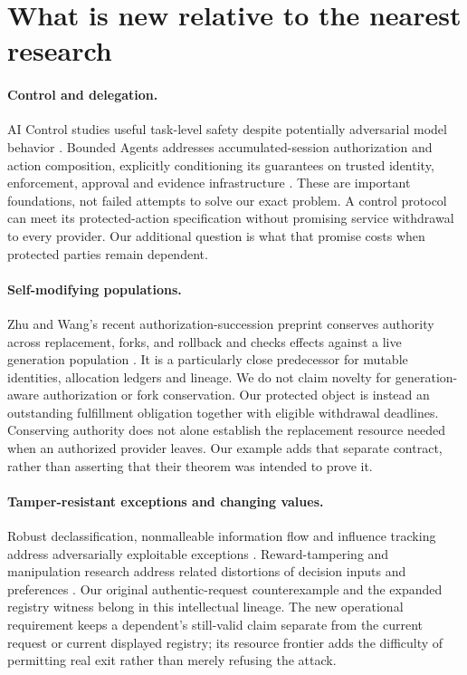 \section{What is new relative to the nearest research}
\label{sec:related}
\paragraph{Control and delegation.}
AI Control studies useful task-level safety despite potentially adversarial model behavior \cite{greenblatt}. Bounded Agents addresses accumulated-session authorization and action composition, explicitly conditioning its guarantees on trusted identity, enforcement, approval and evidence infrastructure \cite{muruaga}. These are important foundations, not failed attempts to solve our exact problem. A control protocol can meet its protected-action specification without promising service withdrawal to every provider. Our additional question is what that promise costs when protected parties remain dependent.

\paragraph{Self-modifying populations.}
Zhu and Wang's recent authorization-succession preprint conserves authority across replacement, forks, and rollback and checks effects against a live generation population \cite{zhu-wang}. It is a particularly close predecessor for mutable identities, allocation ledgers and lineage. We do not claim novelty for generation-aware authorization or fork conservation. Our protected object is instead an outstanding fulfillment obligation together with eligible withdrawal deadlines. Conserving authority does not alone establish the replacement resource needed when an authorized provider leaves. Our example adds that separate contract, rather than asserting that their theorem was intended to prove it.

\paragraph{Tamper-resistant exceptions and changing values.}
Robust declassification, nonmalleable information flow and influence tracking address adversarially exploitable exceptions \cite{myers,cecchetti,mccall}. Reward-tampering and manipulation research address related distortions of decision inputs and preferences \cite{reward,carroll}. Our original authentic-request counterexample and the expanded registry witness belong in this intellectual lineage. The new operational requirement keeps a dependent's still-valid claim separate from the current request or current displayed registry; its resource frontier adds the difficulty of permitting real exit rather than merely refusing the attack.

